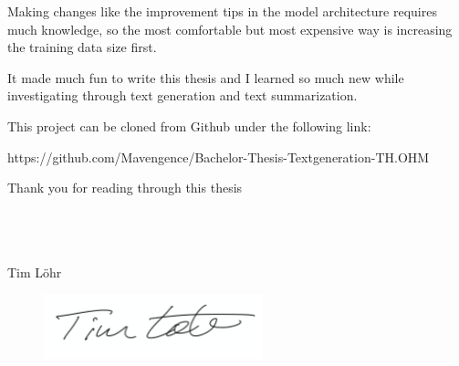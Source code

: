 Making changes like the improvement tips in the model architecture requires much knowledge, so the most comfortable but most expensive way is increasing the training data size first. 

It made much fun to write this thesis and I learned so much new while investigating through text generation and text summarization.

This project can be cloned from Github under the following link:

\begin{tcolorbox}
	https://github.com/Mavengence/Bachelor-Thesis-Textgeneration-TH.OHM
\end{tcolorbox}

Thank you for reading through this thesis \\ \\ \\ \\

\begin{center}
	\large Tim Löhr
\end{center}


\begin{figure}[H]
	\centering
	\includegraphics[width=2.5in]{photos/sign}
\end{figure}